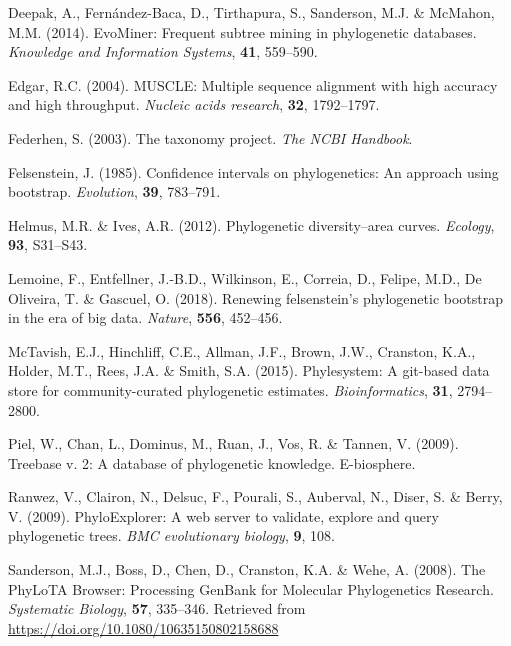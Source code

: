 \documentclass[]{article}
\begin{document}
\leavevmode\hypertarget{ref-deepak2014evominer}{}%
Deepak, A., Fernández-Baca, D., Tirthapura, S., Sanderson, M.J. \& McMahon, M.M. (2014). EvoMiner: Frequent subtree mining in phylogenetic databases. \emph{Knowledge and Information Systems}, \textbf{41}, 559--590.

\leavevmode\hypertarget{ref-edgar2004muscle}{}%
Edgar, R.C. (2004). MUSCLE: Multiple sequence alignment with high accuracy and high throughput. \emph{Nucleic acids research}, \textbf{32}, 1792--1797.

\leavevmode\hypertarget{ref-federhen2003taxonomy}{}%
Federhen, S. (2003). The taxonomy project. \emph{The NCBI Handbook}.

\leavevmode\hypertarget{ref-felsenstein1985confidence}{}%
Felsenstein, J. (1985). Confidence intervals on phylogenetics: An approach using bootstrap. \emph{Evolution}, \textbf{39}, 783--791.

\leavevmode\hypertarget{ref-helmus2012phylogenetic}{}%
Helmus, M.R. \& Ives, A.R. (2012). Phylogenetic diversity--area curves. \emph{Ecology}, \textbf{93}, S31--S43.

\leavevmode\hypertarget{ref-lemoine2018renewing}{}%
Lemoine, F., Entfellner, J.-B.D., Wilkinson, E., Correia, D., Felipe, M.D., De Oliveira, T. \& Gascuel, O. (2018). Renewing felsenstein's phylogenetic bootstrap in the era of big data. \emph{Nature}, \textbf{556}, 452--456.

\leavevmode\hypertarget{ref-mctavish2015phylesystem}{}%
McTavish, E.J., Hinchliff, C.E., Allman, J.F., Brown, J.W., Cranston, K.A., Holder, M.T., Rees, J.A. \& Smith, S.A. (2015). Phylesystem: A git-based data store for community-curated phylogenetic estimates. \emph{Bioinformatics}, \textbf{31}, 2794--2800.

\leavevmode\hypertarget{ref-piel2009treebase}{}%
Piel, W., Chan, L., Dominus, M., Ruan, J., Vos, R. \& Tannen, V. (2009). Treebase v. 2: A database of phylogenetic knowledge. E-biosphere.

\leavevmode\hypertarget{ref-ranwez2009phyloexplorer}{}%
Ranwez, V., Clairon, N., Delsuc, F., Pourali, S., Auberval, N., Diser, S. \& Berry, V. (2009). PhyloExplorer: A web server to validate, explore and query phylogenetic trees. \emph{BMC evolutionary biology}, \textbf{9}, 108.

\leavevmode\hypertarget{ref-sanderson2008phylota}{}%
Sanderson, M.J., Boss, D., Chen, D., Cranston, K.A. \& Wehe, A. (2008). The PhyLoTA Browser: Processing GenBank for Molecular Phylogenetics Research. \emph{Systematic Biology}, \textbf{57}, 335--346. Retrieved from \url{https://doi.org/10.1080/10635150802158688}
\end{document}
